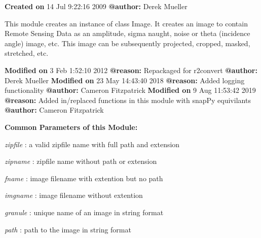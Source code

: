 \documentclass[letterpaper,10pt,openany,oneside]{sphinxmanual}
\begin{document}
\textbf{Created on} 14 Jul  9:22:16 2009 \textbf{@author:} Derek Mueller

This module creates an instance of class Image. It creates an image to 
contain Remote Sensing Data as an amplitude, sigma naught, noise or theta
(incidence angle) image, etc. This image can be subsequently projected,
cropped, masked, stretched, etc.

\textbf{Modified on} 3 Feb  1:52:10 2012 \textbf{@reason:} Repackaged for r2convert \textbf{@author:} Derek Mueller
\textbf{Modified on} 23 May 14:43:40 2018 \textbf{@reason:} Added logging functionality \textbf{@author:} Cameron Fitzpatrick
\textbf{Modified on} 9 Aug  11:53:42 2019 \textbf{@reason:} Added in/replaced functions in this module with snapPy equivilants \textbf{@author:} Cameron Fitzpatrick

\textbf{Common Parameters of this Module:}

\emph{zipfile} : a valid zipfile name with full path and extension

\emph{zipname} : zipfile name without path or extension

\emph{fname} : image filename with extention but no path

\emph{imgname} : image filename without extention

\emph{granule} : unique name of an image in string format

\emph{path} : path to the image in string format
\end{document}
